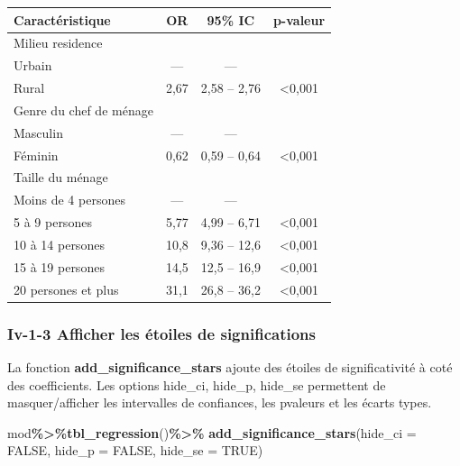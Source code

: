 \documentclass[
]{article}
\newenvironment{Shaded}{\begin{snugshade}}{\end{snugshade}}
\newcommand{\AttributeTok}[1]{\textcolor[rgb]{0.13,0.29,0.53}{#1}}
\newcommand{\ConstantTok}[1]{\textcolor[rgb]{0.56,0.35,0.01}{#1}}
\newcommand{\FunctionTok}[1]{\textcolor[rgb]{0.13,0.29,0.53}{\textbf{#1}}}
\newcommand{\NormalTok}[1]{#1}
\newcommand{\SpecialCharTok}[1]{\textcolor[rgb]{0.81,0.36,0.00}{\textbf{#1}}}
\begin{document}
\begin{longtable}[]{@{}lccc@{}}
\toprule\noalign{}
\textbf{Caractéristique} & \textbf{OR} & \textbf{95\% IC} &
\textbf{p-valeur} \\
\midrule\noalign{}
\endhead
\bottomrule\noalign{}
\endlastfoot
Milieu residence & & & \\
Urbain & --- & --- & \\
Rural & 2,67 & 2,58 -- 2,76 & \textless0,001 \\
Genre du chef de ménage & & & \\
Masculin & --- & --- & \\
Féminin & 0,62 & 0,59 -- 0,64 & \textless0,001 \\
Taille du ménage & & & \\
Moins de 4 persones & --- & --- & \\
5 à 9 persones & 5,77 & 4,99 -- 6,71 & \textless0,001 \\
10 à 14 persones & 10,8 & 9,36 -- 12,6 & \textless0,001 \\
15 à 19 persones & 14,5 & 12,5 -- 16,9 & \textless0,001 \\
20 persones et plus & 31,1 & 26,8 -- 36,2 & \textless0,001 \\
\end{longtable}

\hypertarget{iv-1-3-afficher-les-uxe9toiles-de-significations}{%
\subsubsection{Iv-1-3 Afficher les étoiles de
significations}\label{iv-1-3-afficher-les-uxe9toiles-de-significations}}

La fonction \textbf{add\_significance\_stars} ajoute des étoiles de
significativité à coté des coefficients. Les options hide\_ci, hide\_p,
hide\_se permettent de masquer/afficher les intervalles de confiances,
les pvaleurs et les écarts types.

\begin{Shaded}
\begin{Highlighting}[]
\NormalTok{mod}\SpecialCharTok{\%\textgreater{}\%}\FunctionTok{tbl\_regression}\NormalTok{()}\SpecialCharTok{\%\textgreater{}\%}
  \FunctionTok{add\_significance\_stars}\NormalTok{(}\AttributeTok{hide\_ci =} \ConstantTok{FALSE}\NormalTok{, }
                         \AttributeTok{hide\_p =} \ConstantTok{FALSE}\NormalTok{, }\AttributeTok{hide\_se =} \ConstantTok{TRUE}\NormalTok{)}
\end{Highlighting}
\end{Shaded}
\end{document}
